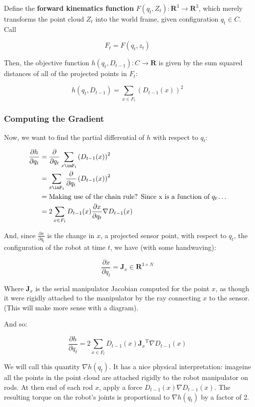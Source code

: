 \documentclass{article}
\begin{document}
Define the \textbf{forward kinematics function} $F(q_t, Z_t) : \mathbf{R}^3 \to
\mathbf{R}^3$, which merely transforms the point cloud $Z_t$ into the world
frame, given configuration $q_t \in C$. Call

$$ F_t = F(q_t, z_t) $$

Then, the objective function $h(q_t, D_{t-1}) : C \to \mathbf{R}$ is given by
the sum squared distances of all of the projected points in $F_t$:

$$ h(q_t, D_{t-1}) = \sum_{x \in F_t}\left(D_{t-1}(x)\right) ^2 $$

\subsubsection{Computing the Gradient}

Now, we want to find the partial differential of $h$ with respect to $q_t$:

\newcommand{\ddq}{\frac{\partial}{\partial q_t}}
\newcommand{\dxdq}{\frac{\partial x}{\partial q_t}}

\begin{align*} 
\frac{\partial{h}}{\partial{q_t}} &= \ddq  \sum_{x \inF_t}\left(D_{t-1}(x)\right) ^2 
\\ &= \sum_{x \inF_t} \ddq \left(D_{t-1}(x)\right) ^2  
\\ &=\text{Making use of the chain rule? Since x is a function of~} q_t \ldots
\\ &= 2\sum_{x \in F_t} D_{t-1}(x) \dxdq \nabla D_{t-1}(x)
\end{align*}

And, since $\dxdq$ is the change in $x$, a projected sensor point, with respect
to $q_t$, the configuration of the robot at time $t$, we have (with some
handwaving):

$$ \dxdq = \mathbf{J}_x \in \mathbf{R}^{3 \times N}$$

Where $\mathbf{J}_x$ is the serial manipulator Jacobian computed for the point
$x$, as though it were rigidly attached to the manipulator by the ray connecting
$x$ to the sensor. (This will make more sense with a diagram).

And so:

$$ \frac{\partial{h}}{\partial{q_t}} = 2\sum_{x \in F_t} D_{t-1}(x)
{\mathbf{J}_x}^{\text{T}} \nabla D_{t-1}(x) $$

\noindent We will call this quantity $\nabla h(q_t)$. It has a nice physical
interpretation: imageine all the points in the point cloud are attached rigidly
to the robot manipulator on rods. At then end of each rod $x$, apply a force
$D_{t - 1}(x) \nabla D_{t -1} (x)$. The resulting torque on the robot's joints
is proportional to $\nabla h(q_t)$ by a factor of 2.
\end{document}
